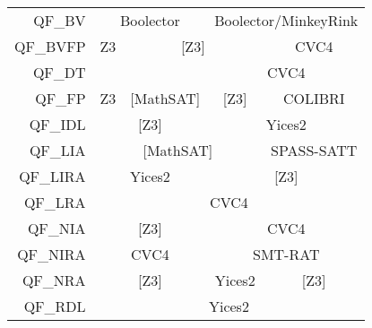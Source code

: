 \begin{table}
{\begin{tabular}{rcccc}
\multicolumn{1}{r|}{QF\_BV}      & \multicolumn{2}{c|}{Boolector}                                      & \multicolumn{2}{c|}{Boolector/MinkeyRink}                             \\ \cline{2-5}
\multicolumn{1}{r|}{QF\_BVFP}    & \multicolumn{1}{c|}{Z3}       & \multicolumn{2}{c|}{{[}Z3{]}}                                       & \multicolumn{1}{c|}{CVC4}             \\ \cline{2-5}
QF\_DT                           & \multicolumn{1}{l}{}          & \multicolumn{1}{l|}{}               & \multicolumn{2}{c|}{CVC4}                                             \\ \cline{2-5}
\multicolumn{1}{r|}{QF\_FP}      & \multicolumn{1}{c|}{Z3}       & \multicolumn{1}{c|}{{[}MathSAT{]}}  & \multicolumn{1}{c|}{{[}Z3{]}} & \multicolumn{1}{c|}{COLIBRI}          \\ \cline{2-5}
\multicolumn{1}{r|}{QF\_IDL}     & \multicolumn{2}{c|}{{[}Z3{]}}                                       & \multicolumn{2}{c|}{Yices2}                                           \\ \cline{2-5}
\multicolumn{1}{r|}{QF\_LIA}     & \multicolumn{3}{c|}{{[}MathSAT{]}}                                                                  & \multicolumn{1}{c|}{SPASS-SATT}       \\ \cline{2-5}
\multicolumn{1}{r|}{QF\_LIRA}    & \multicolumn{2}{c|}{Yices2}                                         & \multicolumn{2}{c|}{{[}Z3{]}}                                         \\ \cline{2-5}
\multicolumn{1}{r|}{QF\_LRA}     & \multicolumn{4}{c|}{CVC4}                                                                                                                   \\ \cline{2-5}
\multicolumn{1}{r|}{QF\_NIA}     & \multicolumn{2}{c|}{{[}Z3{]}}                                       & \multicolumn{2}{c|}{CVC4}                                             \\ \cline{2-5}
\multicolumn{1}{r|}{QF\_NIRA}    & \multicolumn{2}{c|}{CVC4}                                           & \multicolumn{2}{c|}{SMT-RAT}                                          \\ \cline{2-5}
\multicolumn{1}{r|}{QF\_NRA}     & \multicolumn{2}{c|}{{[}Z3{]}}                                       & \multicolumn{1}{c|}{Yices2}   & \multicolumn{1}{c|}{{[}Z3{]}}         \\ \cline{2-5}
\multicolumn{1}{r|}{QF\_RDL}     & \multicolumn{4}{c|}{Yices2}                                                                                                                 \\ \cline{2-5}

\end{tabular}}
\end{table}

